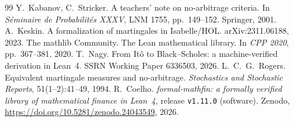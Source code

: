 \documentclass[11pt]{article}
\begin{document}
\begin{thebibliography}{99}
 Y.~Kabanov, C.~Stricker. A teachers' note on no-arbitrage criteria. In
  \emph{S\'eminaire de Probabilit\'es XXXV}, LNM 1755, pp.~149--152. Springer, 2001.
 A.~Keskin. A formalization of martingales in Isabelle/HOL. arXiv:2311.06188, 2023.
 The mathlib Community. The Lean mathematical library. In \emph{CPP 2020},
  pp.~367--381, 2020.
 T.~Nagy. From It\^o to Black--Scholes: a machine-verified derivation in Lean~4. SSRN
  Working Paper 6336503, 2026.
 L.~C.~G.~Rogers. Equivalent martingale measures and no-arbitrage.
  \emph{Stochastics and Stochastic Reports}, 51(1--2):41--49, 1994.
 R.~Coelho. \emph{formal-mathfin: a formally verified library of mathematical finance in
  Lean~4}, release \texttt{v1.11.0} (software). Zenodo, \url{https://doi.org/10.5281/zenodo.24043549}, 2026.
\end{thebibliography}
\end{document}

